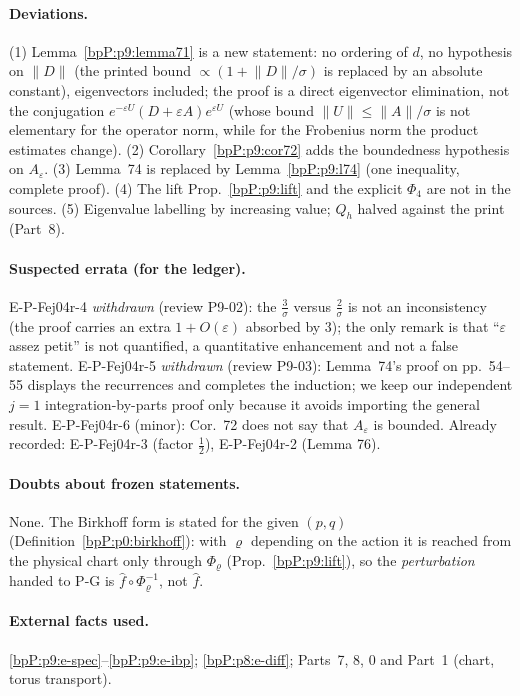 \paragraph{Deviations.} (1) Lemma~\ref{bpP:p9:lemma71} is a new statement: no ordering of $d$, no hypothesis on $\lVert D\rVert$ (the printed bound $\propto(1+\lVert D\rVert/\sigma)$ is replaced by an absolute constant), eigenvectors included; the proof is a direct eigenvector elimination, not the conjugation $e^{-\varepsilon U}(D+\varepsilon A)e^{\varepsilon U}$ (whose bound $\lVert U\rVert\le\lVert A\rVert/\sigma$ is not elementary for the operator norm, while for the Frobenius norm the product estimates change). (2) Corollary~\ref{bpP:p9:cor72} adds the boundedness hypothesis on $A_\varepsilon$. (3) Lemma~74 is replaced by Lemma~\ref{bpP:p9:l74} (one inequality, complete proof). (4) The lift Prop.~\ref{bpP:p9:lift} and the explicit $\Phi_4$ are not in the sources. (5) Eigenvalue labelling by increasing value; $Q_h$ halved against the print (Part~8).

\paragraph{Suspected errata (for the ledger).} E-P-Fej04r-4 \emph{withdrawn} (review P9-02): the $\tfrac3\sigma$ versus $\tfrac2\sigma$ is not an inconsistency (the proof carries an extra $1+O(\varepsilon)$ absorbed by $3$); the only remark is that ``$\varepsilon$ assez petit'' is not quantified, a quantitative enhancement and not a false statement. E-P-Fej04r-5 \emph{withdrawn} (review P9-03): Lemma~74's proof on pp.~54--55 displays the recurrences and completes the induction; we keep our independent $j=1$ integration-by-parts proof only because it avoids importing the general result. E-P-Fej04r-6 (minor): Cor.~72 does not say that $A_\varepsilon$ is bounded. Already recorded: E-P-Fej04r-3 (factor $\tfrac12$), E-P-Fej04r-2 (Lemma 76).

\paragraph{Doubts about frozen statements.} None. The Birkhoff form is stated for the given $(p,q)$ (Definition~\ref{bpP:p0:birkhoff}): with $\varrho$ depending on the action it is reached from the physical chart only through $\Phi_\varrho$ (Prop.~\ref{bpP:p9:lift}), so the \emph{perturbation} handed to P-G is $\hat f\circ\Phi_\varrho^{-1}$, not $\hat f$.

\paragraph{External facts used.} \ref{bpP:p9:e-spec}--\ref{bpP:p9:e-ibp}; \ref{bpP:p8:e-diff}; Parts~7, 8, 0 and Part~1 (chart, torus transport).

